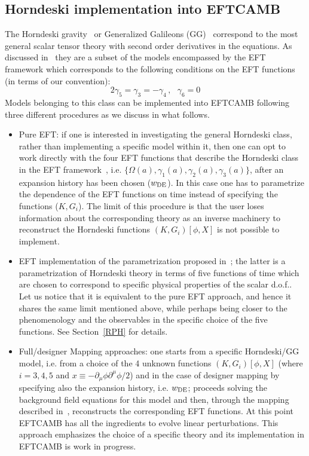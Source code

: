 \documentclass[prd,nofootinbib,showpacs]{revtex4}
\def\be{\begin{equation}}
\def\ee{\end{equation}}
\begin{document}
{\subsection{Horndeski implementation into EFTCAMB}\label{pureHorndeski}

The Horndeski gravity~\cite{Horndeski:1974wa} or  Generalized Galileons (GG)~\cite{Deffayet:2009mn} correspond to the most general scalar tensor theory with second order derivatives in the equations. As discussed in~\cite{Gleyzes:2013ooa,Bloomfield:2013efa} they are a subset of the models encompassed by the EFT framework which corresponds to the following conditions on the EFT functions (in terms of our convention):
\be\label{Horndeski_condition}
2\gamma_5=\gamma_3=-\gamma_4\,,\,\,\,\,\gamma_6=0
\ee
Models belonging to this class can be implemented into EFTCAMB following three different procedures as we discuss in what follows. 
\begin{itemize}
\item Pure EFT: if one is interested in investigating the general Horndeski class, rather than implementing a specific model within it, then one can opt to work directly with the four EFT functions that describe the Horndeski class in the EFT framework~\cite{Bloomfield:2013efa}, i.e. $\{\Omega(a), \gamma_1(a),\gamma_2(a),\gamma_3(a)\}$, after an expansion history has been chosen ($w_{\rm DE}$). In this case one has to parametrize the dependence of the EFT functions on time instead of specifying the functions  ($K,G_i$).  The limit of this procedure is that the user loses information about the corresponding theory as an inverse machinery to reconstruct the Horndeski functions $(K,G_i)[\phi,X]$ is not possible to implement.    
\item  EFT implementation of the parametrization proposed in~\cite{Bellini:2014fua}; the latter is a parametrization of Horndeski theory in terms  of five functions of time which are chosen to correspond to specific physical properties of the scalar d.o.f.. Let us notice that it is equivalent to the pure EFT approach, and hence it shares the same limit mentioned above, while perhaps being closer to the phenomenology and the observables in the specific choice of the five functions. See Section~\ref{RPH} for details. 
\item Full/designer Mapping approaches: one starts from a specific Horndeski/GG model, i.e. from a choice of the 4 unknown  functions $(K,G_i)[\phi,X]$ (where $i=3,4,5$ and $x\equiv -\partial_\mu \phi\partial^\mu\phi/2$) and in the case of designer mapping by specifying also the expansion history, i.e. $w_{\rm DE}$; proceeds solving the background field equations for this model and then, through the mapping described in~\cite{Gleyzes:2013ooa,Bloomfield:2013efa}, reconstructs the corresponding EFT functions. At this point EFTCAMB has all the ingredients to evolve linear perturbations. This approach emphasizes the choice of a specific theory and its implementation in EFTCAMB is work in progress.
\end{itemize}

}
\end{document}
